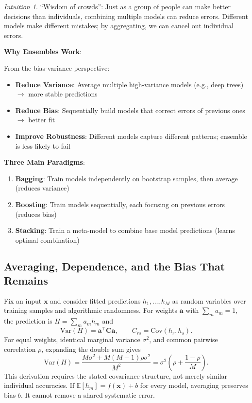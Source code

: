 \documentclass[11pt,twoside]{article}
\numberwithin{equation}{section}
\newcommand{\E}{\mathbb{E}}
\newcommand{\Var}{\mathrm{Var}}
\newcommand{\Cov}{\mathrm{Cov}}
\newcommand{\vect}[1]{\bm{#1}}
\newcommand{\mat}[1]{\bm{#1}}
\theoremstyle{plain}
\theoremstyle{definition}
\theoremstyle{remark}
\newtheorem{intuition}[theorem]{Intuition}
\newenvironment{keyidea}{
  \begin{tcolorbox}[colback=yellow!5!white,
                    colframe=yellow!50!black,
                    title=Key Idea,
                    breakable,
                    enhanced,
                    sharp corners,
                    boxrule=0.8pt,
                    left=6pt, right=6pt, top=6pt, bottom=6pt]
}{
  \end{tcolorbox}
}
\begin{document}
\begin{intuition}
``Wisdom of crowds'': Just as a group of people can make better decisions than individuals, combining multiple models can reduce errors. Different models make different mistakes; by aggregating, we can cancel out individual errors.
\end{intuition}

\begin{keyidea}
\textbf{Why Ensembles Work}:

From the bias-variance perspective:
\begin{itemize}
\item \textbf{Reduce Variance}: Average multiple high-variance models (e.g., deep trees) $\to$ more stable predictions
\item \textbf{Reduce Bias}: Sequentially build models that correct errors of previous ones $\to$ better fit
\item \textbf{Improve Robustness}: Different models capture different patterns; ensemble is less likely to fail
\end{itemize}

\textbf{Three Main Paradigms}:
\begin{enumerate}
\item \textbf{Bagging}: Train models independently on bootstrap samples, then average (reduces variance)
\item \textbf{Boosting}: Train models sequentially, each focusing on previous errors (reduces bias)
\item \textbf{Stacking}: Train a meta-model to combine base model predictions (learns optimal combination)
\end{enumerate}
\end{keyidea}

\subsection{Averaging, Dependence, and the Bias That Remains}
\label{sec:ensemble-dependence}
Fix an input $\vect x$ and consider fitted predictions $h_1,\ldots,h_M$ as random variables over training samples and algorithmic randomness. For weights $\vect a$ with $\sum_m a_m=1$, the prediction is $H=\sum_m a_mh_m$ and
\[
\Var(H)=\vect a^\top\mat C\vect a,\qquad C_{rs}=\Cov(h_r,h_s).
\]
For equal weights, identical marginal variance $\sigma^2$, and common pairwise correlation $\rho$, expanding the double sum gives
\begin{equation}\label{eq:ensemble-variance}
\Var(H)=\frac{M\sigma^2+M(M-1)\rho\sigma^2}{M^2}
=\sigma^2\left(\rho+\frac{1-\rho}{M}\right).
\end{equation}
This derivation requires the stated covariance structure, not merely similar individual accuracies. If $\E[h_m]=f(\vect x)+b$ for every model, averaging preserves bias $b$. It cannot remove a shared systematic error.
\end{document}
